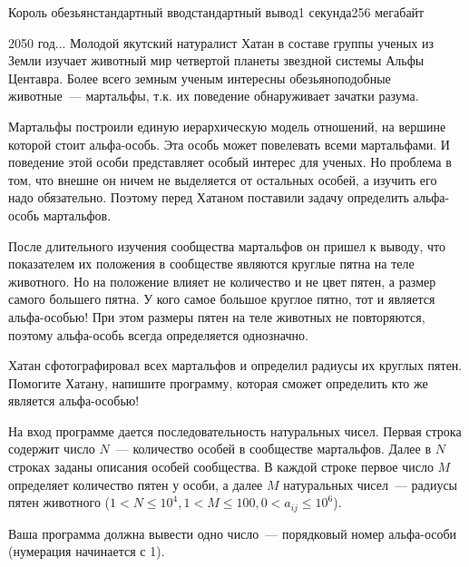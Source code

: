 \begin{problem}{Король обезьян}{стандартный ввод}{стандартный вывод}{1 секунда}{256 мегабайт}

2050 год... Молодой якутский натуралист Хатан в составе группы ученых из Земли изучает животный мир четвертой планеты звездной системы Альфы Центавра. Более всего земным ученым интересны обезьяноподобные животные~--- мартальфы, т.к. их поведение обнаруживает зачатки разума. 

Мартальфы построили единую иерархическую модель отношений, на вершине которой стоит альфа-особь. Эта особь может повелевать всеми мартальфами. И поведение этой особи представляет особый интерес для ученых. Но проблема в том, что внешне он ничем не выделяется от остальных особей, а изучить его надо обязательно. Поэтому перед Хатаном поставили задачу определить альфа-особь мартальфов.

После длительного изучения сообщества мартальфов он пришел к выводу, что показателем их положения в сообществе являются круглые пятна на теле животного. Но на положение влияет не количество и не цвет пятен, а размер самого большего пятна. У кого самое большое круглое пятно, тот и является альфа-особью! При этом размеры пятен на теле животных не повторяются, поэтому альфа-особь всегда определяется однозначно.

Хатан сфотографировал всех мартальфов и определил радиусы их круглых пятен. Помогите Хатану, напишите программу, которая сможет определить кто же является альфа-особью!

\InputFile
На вход программе дается последовательность натуральных чисел. Первая строка содержит число $N$~--- количество особей в сообществе мартальфов. Далее в $N$ строках заданы описания особей сообщества. В каждой строке первое число $M$ определяет количество пятен у особи, а далее $M$ натуральных чисел~--- радиусы пятен животного ($1<N \leq 10^4, 1<M \leq 100, 0< a_{ij} \leq 10^6$). 

\OutputFile
Ваша программа должна вывести одно число~--- порядковый номер альфа-особи (нумерация начинается с 1).

\Example

\begin{example}
%
\end{example}

\end{problem}

